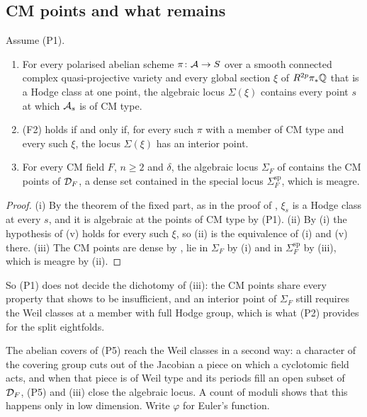 \subsection{CM points and what remains}\label{ssec:remains}

\begin{corollary}\label{cor:f2cm}
Assume \textup{(P1)}.
\begin{enumerate}[label=\textup{(\roman*)},leftmargin=2.6em,itemsep=2pt]
\item For every polarised abelian scheme $\pi\colon\mathcal{A}\to S$ over a smooth
  connected complex quasi-projective variety and every global section $\xi$
  of $R^{2p}\pi_{*}\mathbb{Q}$ that is a Hodge class at one point, the algebraic
  locus $\Sigma(\xi)$ contains every point $s$ at which $\mathcal{A}_{s}$ is of CM
  type.
\item \textup{(F2)} holds if and only if, for every such $\pi$ with a member
  of CM type and every such $\xi$, the locus $\Sigma(\xi)$ has an interior
  point.
\item For every CM field $F$, $n\ge2$ and $\delta$, the algebraic locus
  $\Sigma_{F}$ of  contains the CM points of $\mathcal{D}_{F}$, a dense
  set contained in the special locus $\Sigma^{\mathrm{sp}}_{F}$, which is
  meagre.
\end{enumerate}
\end{corollary}

\begin{proof}
(i) By the theorem of the fixed part, as in the proof of
, $\xi_{s}$ is a Hodge class at every $s$, and it is
algebraic at the points of CM type by (P1). (ii) By (i) the hypothesis of
(v) holds for every such $\xi$, so (ii) is the
equivalence of (i) and (v) there. (iii) The CM points are dense by
, lie in $\Sigma_{F}$ by (i) and in
$\Sigma^{\mathrm{sp}}_{F}$ by (iii), which is meagre
by (ii).
\end{proof}

So (P1) does not decide the dichotomy of (iii): the CM points
share every property that  shows to be insufficient, and an
interior point of $\Sigma_{F}$ still requires the Weil classes at a member
with full Hodge group, which is what (P2) provides for the split eightfolds.

The abelian covers of (P5) reach the Weil classes in a second way: a
character of the covering group cuts out of the Jacobian a piece on which a
cyclotomic field acts, and when that piece is of Weil type and its periods
fill an open subset of $\mathcal{D}_{F}$, (P5) and (iii) close the
algebraic locus. A count of moduli shows that this happens only in low
dimension. Write $\varphi$ for Euler's function.

